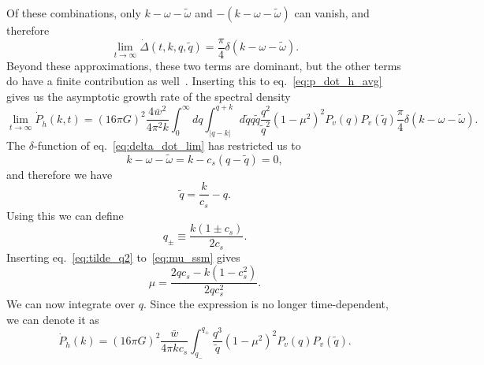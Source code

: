 \fi
Of these combinations, only $k - \omega - \tilde{\omega}$ and $-(k - \omega - \tilde{\omega})$ can vanish,
and therefore
\begin{equation}
\lim_{t\rightarrow\infty} \dot{\Delta}(t,k,q,\tilde{q}) = \frac{\pi}{4} \delta (k - \omega - \tilde{\omega}).
\label{eq:delta_dot_lim}
\end{equation}
Beyond these approximations, these two terms are dominant,
but the other terms do have a finite contribution as well~\cites{sharma_shallow_2023}{pol_characterization_2023}.
Inserting this to eq.~\eqref{eq:p_dot_h_avg} gives us the asymptotic growth rate of the spectral density
\begin{equation}
\lim_{t \rightarrow \infty} \dot{P}_{\dot{h}}(k,t)
= (16 \pi G)^2 \frac{4 \bar{w}^2}{4 \pi^2 k} \int_0^\infty dq \int_{|q-k|}^{q+k} d\tilde{q} q \tilde{q} \frac{q^2}{\tilde{q}^2} (1 - \mu^2)^2 P_v(q) P_v(\tilde{q}) \frac{\pi}{4} \delta (k - \omega - \tilde{\omega}).
\end{equation}
The $\delta$-function of eq.~\eqref{eq:delta_dot_lim} has restricted us to
\begin{equation}
k - \omega - \tilde{\omega} = k - c_s (q - \tilde{q}) = 0,
\end{equation}
and therefore we have
\begin{equation}
\tilde{q} = \frac{k}{c_s} - q.
\label{eq:tilde_q2}
\end{equation}
Using this we can define
\begin{equation}
q_\pm \equiv \frac{k(1 \pm c_s)}{2 c_s}.
\end{equation}
Inserting eq.~\eqref{eq:tilde_q2} to~\eqref{eq:mu_ssm} gives
\begin{equation}
\mu = \frac{2qc_s - k(1 - c_s^2)}{2qc_s^2}.
\end{equation}
We can now integrate over $q$. Since the expression is no longer time-dependent,
we can denote it as
\begin{equation}
\dot{P}_{\dot{h}}(k) = (16 \pi G)^2 \frac{\bar{w}}{4 \pi k c_s} \int_{q_-}^{q_+} \frac{q^3}{\tilde{q}} (1 - \mu^2)^2 P_v(q) P_v(\tilde{q}).
\label{eq:dot_p_dot_h}
\end{equation}

